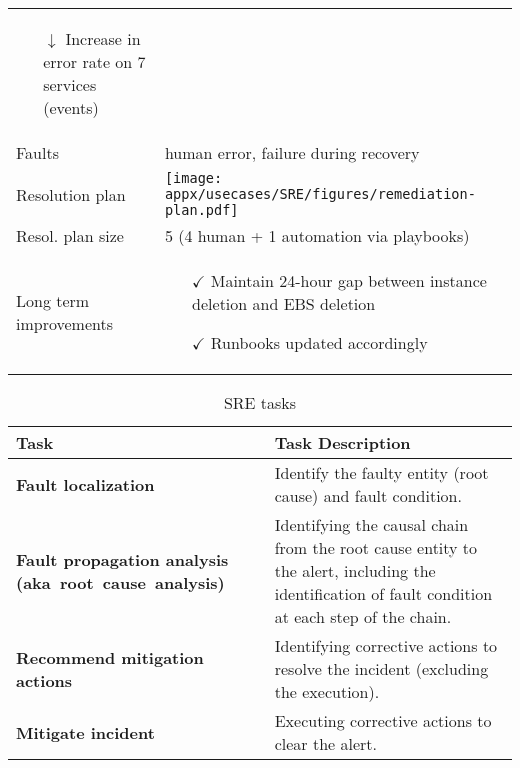 \begin{table*}
\begin{threeparttable}
\begin{tabular}{m{}m{}}
\begin{itemize}[left=0pt, topsep=0pt, partopsep=0pt, itemsep=0pt, parsep=0pt]
                \item [$\downarrow$] Increase in error rate on 7 services (events)
            \end{itemize} \\
            Faults & human error, failure during recovery \\
            Resolution plan & \texttt{[image: appx/usecases/SRE/figures/remediation-plan.pdf]}\\
            Resol. plan size & 5 (4 human + 1 automation via playbooks) \\
            Long term improvements & \begin{itemize}[left=0pt, topsep=0pt, partopsep=0pt, itemsep=0pt, parsep=0pt]
                \item [$\checkmark$] Maintain 24-hour gap between instance deletion and EBS deletion
                \item [$\checkmark$] Runbooks updated accordingly
            \end{itemize} \\
            \bottomrule
        \end{tabular}
    \end{threeparttable}
\end{table*}



\begin{table*}[h]
    \centering
    \begin{threeparttable}
        \caption{SRE tasks}
        \label{tab:bench_sre_tasks}
        \begin{tabular}{p{}p{}}
            \toprule
            \textbf{Task} & \textbf{Task Description} \\
            \midrule
            \textbf{Fault localization} & Identify the faulty entity (root cause) and fault condition. \\
            \textbf{Fault propagation analysis \mbox{(aka root cause analysis)}} & Identifying the causal chain from the root cause entity to the alert, including the identification of fault condition at each step of the chain. \\
            \textbf{Recommend mitigation actions} & Identifying corrective actions to resolve the incident (excluding the execution). \\
            \textbf{Mitigate incident} & Executing corrective actions to clear the alert. \\
            \bottomrule
        \end{tabular}
    \end{threeparttable}
\end{table*}



